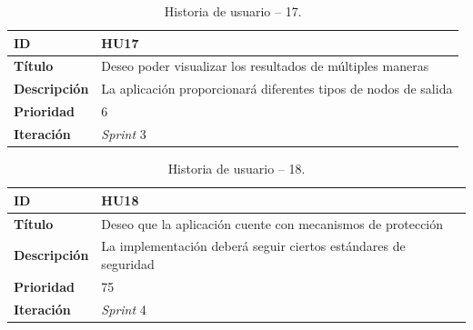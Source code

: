 \begin{table}[H]
    \begin{center}
        \begin{tabularx}{\textwidth}{| l | X |}
            \hline
            \textbf{ID}             & HU17 \\ \hline
            \textbf{Título}         & Deseo poder visualizar los resultados de múltiples maneras \\ \hline
            \textbf{Descripción}    & La aplicación proporcionará diferentes tipos de nodos de salida \\ \hline
            \textbf{Prioridad}      & 6 \\ \hline
            \textbf{Iteración}      & \textit{Sprint} 3\\ \hline
        \end{tabularx}
    \end{center}
    \caption{Historia de usuario -- 17.}
    \label{tab:hu17}
\end{table}

\begin{table}[H]
    \begin{center}
        \begin{tabularx}{\textwidth}{| l | X |}
            \hline
            \textbf{ID}             & HU18 \\ \hline
            \textbf{Título}         & Deseo que la aplicación cuente con mecanismos de protección \\ \hline
            \textbf{Descripción}    & La implementación deberá seguir ciertos estándares de seguridad \\ \hline
            \textbf{Prioridad}      & 75 \\ \hline
            \textbf{Iteración}      & \textit{Sprint} 4\\ \hline
        \end{tabularx}
    \end{center}
    \caption{Historia de usuario -- 18.}
    \label{tab:hu18}
\end{table}


